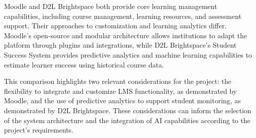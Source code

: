 \noindent Moodle and D2L Brightspace both provide core learning management capabilities, including course management, learning resources, and assessment support. Their approaches to customization and learning analytics differ. Moodle's open-source and modular architecture allows institutions to adapt the platform through plugins and integrations, while D2L Brightspace's Student Success System provides predictive analytics and machine learning capabilities to estimate learner success using historical course data. 

\noindent This comparison highlights two relevant considerations for the project: the flexibility to integrate and customize LMS functionality, as demonstrated by Moodle, and the use of predictive analytics to support student monitoring, as demonstrated by D2L Brightspace. These considerations can inform the selection of the system architecture and the integration of AI capabilities according to the project's requirements.




